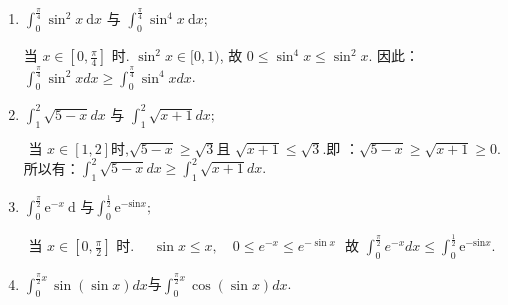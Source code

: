 \documentclass[lang=cn,newtx,10pt,scheme=chinese]{elegantbook}
\begin{document}
\begin{enumerate}
	\item $\displaystyle\int_0^{\frac{\pi}{4}} \sin ^2 x \mathrm{~d} x$ 与 $\displaystyle\int_0^{\frac{\pi}{4}} \sin ^4 x \mathrm{~d} x$;
	\begin{solution}
	当 $x\displaystyle\in\left[0, \frac{\pi}{4}\right]$ 时. $\sin ^2 x \in[0,1)$, 故 $0 \leqslant \sin ^4 x \leqslant \sin ^2 x$.\quad 
	因此：$\displaystyle\int_0^{\frac{\pi}{4}} \sin ^2 x d x \geqslant \int_0^{\frac{\pi}{4}} \sin ^4 x d x$.\\
	\end{solution}

\item $ \displaystyle\int_1^2 \sqrt{5-x} d x \text { 与 } \int_1^2 \sqrt{x+1} d x ;$ 
\begin{solution}
	$\text { 当 } x \displaystyle\in[1,2] \text {时,} \sqrt{5-x} \geqslant \sqrt{3} \text {且 } \sqrt{x+1} \leqslant \sqrt{3} \text {.即 ：} \sqrt{5-x} \geqslant \sqrt{x+1} \geqslant 0 .$ 
	所以有：$\displaystyle \int_1^2 \sqrt{5-x} d x \geqslant \int_1^2 \sqrt{x+1} d x.$
\end{solution}
\item $ \displaystyle\int_0^{\frac{\pi}{2}} \mathrm{e}^{-x} \mathrm{~d} \text { 与} \int_0^{\frac{1}{2}} \mathrm{e}^{-\mathrm{sin} x} \text {; }$ 
\begin{solution}
	$ \text { 当 } x \displaystyle\in\left[0, \frac{\pi}{2}\right] \text { 时. } \quad \sin x \leq x, \quad 0 \leq e^{-x} \leq e^{-\sin x}$\quad
	$\text { 故 }\displaystyle \int_0^{\frac{\pi}{2}} e^{-x} d x \leqslant \int_0^{\frac{1}{2}} \mathrm{e}^{-\mathrm{sin} x}.$
\end{solution}

\item $\displaystyle\int_{0}^{\frac{\pi}{2}x}\sin(\sin x) dx$与$\displaystyle\int_{0}^{\frac{\pi}{2}x}\cos(\sin x) dx$.


\end{enumerate}
\end{document}
